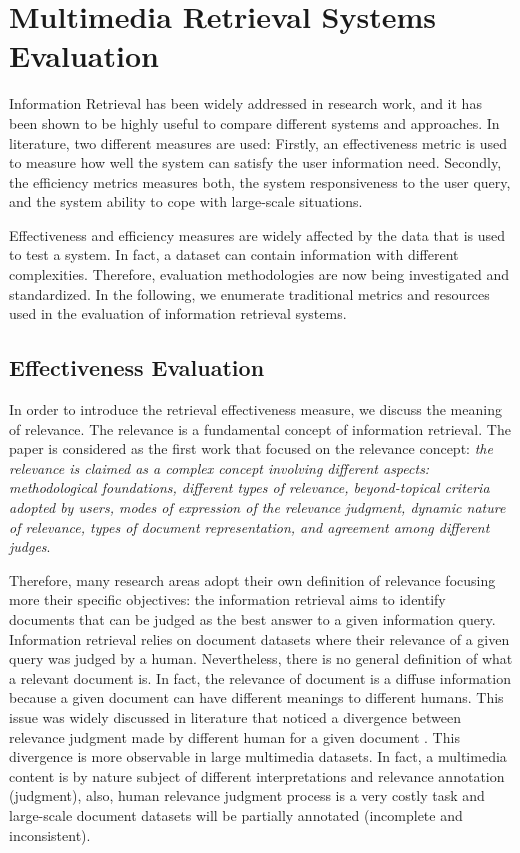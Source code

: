 	\section{Multimedia Retrieval Systems Evaluation}
		Information Retrieval has been widely addressed in research work, and it has been shown  
		to be highly useful to compare different systems and approaches. In literature, two different 
		measures are used: Firstly, an effectiveness metric is used to measure how well the system
		can satisfy the user information need. Secondly, the efficiency metrics measures both, 
		the system  responsiveness to the user query, and the system ability to cope with large-scale situations.
		
		Effectiveness and efficiency measures are widely affected by the data that is used to test a system. 
		In fact, a dataset can contain information with different complexities. Therefore, evaluation 
		methodologies are now being investigated and standardized. In the following, we enumerate 
		traditional metrics and resources used in the evaluation of information retrieval systems.

		\subsection{Effectiveness Evaluation}
		In order to introduce the retrieval effectiveness measure, we discuss the meaning of relevance.
		The relevance is a fundamental concept of information retrieval. The paper \citep{Mizzaro1997}
		is considered as the first work that focused on the relevance concept: \emph{the relevance is 
		claimed as a complex concept involving different aspects: methodological foundations, different 
		types of relevance, beyond-topical criteria adopted by users, modes of expression of the relevance 
		judgment, dynamic nature of relevance, types of document representation, and agreement among 
		different judges}.

		Therefore, many research areas adopt their own definition of relevance focusing more  their 
		specific objectives: the information retrieval aims to identify documents that can be judged as  
		the best answer to a given information query. Information retrieval relies on document datasets 
		where their relevance of a given query was judged by a human. Nevertheless, there is no general 
		definition of what a relevant document is. In fact, the relevance of  document is a diffuse 
		information because a given document can have different meanings to different humans. 
		This issue was widely discussed in literature that noticed a divergence between relevance 
		judgment made by different human for a given document \citep{Voorhees2000,Volkmer2007}.
		This divergence is more observable in large multimedia datasets. In fact, a multimedia content 
		is by nature subject of different interpretations and relevance annotation (judgment), also, 
		human relevance judgment process is a very costly task and large-scale document datasets will
		be partially annotated (incomplete and inconsistent).

